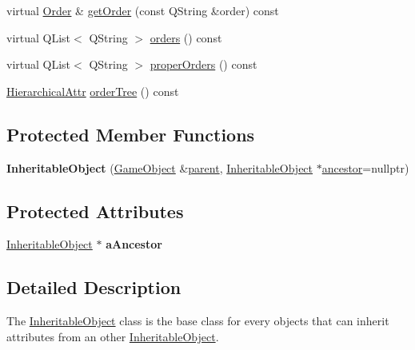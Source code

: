 \begin{DoxyCompactItemize}
\item 
virtual \hyperlink{class_order}{\-Order} \& \hyperlink{class_inheritable_object_a4baa8a0ca7260e9fcda0f9b4d5be4b85}{get\-Order} (const \-Q\-String \&order) const 
\item 
virtual \-Q\-List$<$ \-Q\-String $>$ \hyperlink{class_inheritable_object_a665d17d695bdec5fe43527331bb060f4}{orders} () const 
\item 
virtual \-Q\-List$<$ \-Q\-String $>$ \hyperlink{class_inheritable_object_a775abc07846dcbc608df18fa6ace04cb}{proper\-Orders} () const 
\item 
\hyperlink{gameobject_8h_a2679b210263ad72f002dee6909ea222b}{\-Hierarchical\-Attr} \hyperlink{class_inheritable_object_a63ed35ad744ac4f1e94eccbd82296101}{order\-Tree} () const 
\end{DoxyCompactItemize}
\subsection*{\-Protected \-Member \-Functions}
\begin{DoxyCompactItemize}
\item 
\hypertarget{class_inheritable_object_af01c47efbda743217889d5e0be652c7b}{{\bfseries \-Inheritable\-Object} (\hyperlink{class_game_object}{\-Game\-Object} \&\hyperlink{class_game_object_af3deaf39cde23c189765634e32e95bb4}{parent}, \hyperlink{class_inheritable_object}{\-Inheritable\-Object} $\ast$\hyperlink{class_inheritable_object_a10eead70368227b7f15f44f91d234fa5}{ancestor}=nullptr)}\label{class_inheritable_object_af01c47efbda743217889d5e0be652c7b}

\end{DoxyCompactItemize}
\subsection*{\-Protected \-Attributes}
\begin{DoxyCompactItemize}
\item 
\hypertarget{class_inheritable_object_a985dc4856beac7cd6bbd3a2f534e42ff}{\hyperlink{class_inheritable_object}{\-Inheritable\-Object} $\ast$ {\bfseries a\-Ancestor}}\label{class_inheritable_object_a985dc4856beac7cd6bbd3a2f534e42ff}

\end{DoxyCompactItemize}


\subsection{\-Detailed \-Description}
\-The \hyperlink{class_inheritable_object}{\-Inheritable\-Object} class is the base class for every objects that can inherit attributes from an other \hyperlink{class_inheritable_object}{\-Inheritable\-Object}. 

